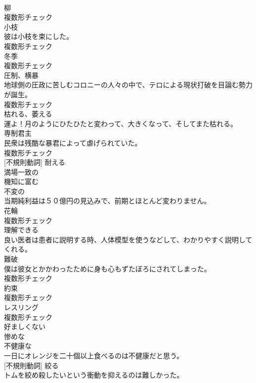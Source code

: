 \documentclass[8pt]{extreport}
\begin{document}
\begin{CJK}{UTF8}{min}
\\	[名詞]	柳	
\\	複数形チェック
\\	[名詞]	小枝	
\\	彼は小枝を束にした。	
\\	複数形チェック
\\	[名詞]	冬季	
\\	複数形チェック
\\	[名詞]	圧制、横暴	
\\	地球側の圧政に苦しむコロニーの人々の中で、テロによる現状打破を目論む勢力が誕生。	
\\	複数形チェック
\\	[動詞]	枯れる、萎える	
\\	運よ！月のようにひたひたと変わって、大きくなって、そしてまた枯れる。	
\\	[名詞]	専制君主	
\\	民衆は残酷な暴君によって虐げられていた。	
\\	複数形チェック
\\	[動詞] [不規則動詞]	耐える	
\\	[形容詞]	満場一致の	
\\	[形容詞]	機知に富む	
\\	[形容詞]	不変の	
\\	当期純利益は５０億円の見込みで、前期とほとんど変わりません。	
\\	[名詞]	花輪	
\\	複数形チェック
\\	[形容詞]	理解できる	
\\	良い医者は患者に説明する時、人体模型を使うなどして、わかりやすく説明してくれる。	
\\	[名詞]	難破	
\\	僕は彼女とかかわったために身も心もずたぼろにされてしまった。	
\\	複数形チェック
\\	[名詞]	約束	
\\	複数形チェック
\\	[名詞]	レスリング	
\\	複数形チェック
\\	[形容詞]	好ましくない	
\\	[形容詞]	惨めな	
\\	[形容詞]	不健康な	
\\	一日にオレンジを二十個以上食べるのは不健康だと思う。	
\\	[動詞] [不規則動詞]	絞る	
\\	トムを絞め殺したいという衝動を抑えるのは難しかった。	

\end{CJK}
\end{document}
